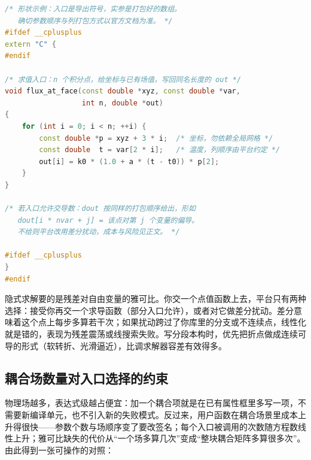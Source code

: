 \documentclass[12pt,a4paper,fontset=fandol]{ctexbook}
\begin{document}
\begin{lstlisting}[language=C++, style=cppstyle,
  caption={外部编译型用户函数：通用的调用形状（签名由平台决定）},
  label={lst:ch07-extfun-shape}]
/* 形状示例：入口是导出符号，实参是打包好的数组。
   确切参数顺序与列打包方式以官方文档为准。 */
#ifdef __cplusplus
extern "C" {
#endif

/* 求值入口：n 个积分点，给坐标与已有场值，写回同名长度的 out */
void flux_at_face(const double *xyz, const double *var,
                  int n, double *out)
{
    for (int i = 0; i < n; ++i) {
        const double *p = xyz + 3 * i;  /* 坐标，勿依赖全局网格 */
        const double  t = var[2 * i];   /* 温度，列顺序由平台约定 */
        out[i] = k0 * (1.0 + a * (t - t0)) * p[2];
    }
}

/* 若入口允许交导数：dout 按同样的打包顺序给出，形如
   dout[i * nvar + j] = 该点对第 j 个变量的偏导。
   不给则平台改用差分扰动，成本与风险见正文。 */

#ifdef __cplusplus
}
#endif
\end{lstlisting}

\begin{note}[title={外部函数必须回答``导数从哪来''}]
隐式求解要的是残差对自由变量的雅可比。你交一个点值函数上去，平台只有两种选择：接受你再交一个求导函数（部分入口允许），或者对它做差分扰动。差分意味着这个点上每步多算若干次；如果扰动跨过了你库里的分支或不连续点，线性化就是错的，表现为残差震荡或线搜索失败。写分段本构时，优先把折点做成连续可导的形式（软转折、光滑逼近），比调求解器容差有效得多。
\end{note}

\subsection*{耦合场数量对入口选择的约束}

物理场越多，表达式级越占便宜：加一个耦合项就是在已有属性框里多写一项，不需要新编译单元，也不引入新的失败模式。反过来，用户函数在耦合场景里成本上升得很快——参数个数与场顺序变了要改签名；每个入口被调用的次数随方程数线性上升；雅可比缺失的代价从``一个场多算几次''变成``整块耦合矩阵多算很多次''。由此得到一张可操作的对照：
\end{document}
